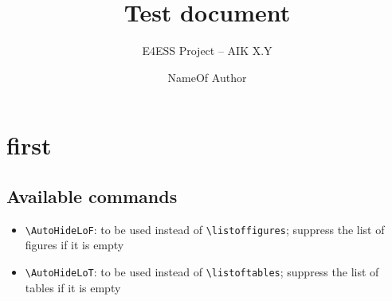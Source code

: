 \documentclass[a4paper,article]{e4esslayout}
\title{%
	Test document
}
\subtitle{%
	E4ESS Project -- AIK X.Y
}
\author{%
	NameOf Author
}
\begin{document}
\raggedbottom



\chapter{first}

\section{Available commands}
\label{sec:ava-com}
\begin{itemize}
	\item \verb^\AutoHideLoF^: to be used instead of \verb^\listoffigures^; suppress the list of figures if it is empty
	\item \verb^\AutoHideLoT^: to be used instead of \verb^\listoftables^; suppress the list of tables if it is empty
\end{itemize}
\end{document}
